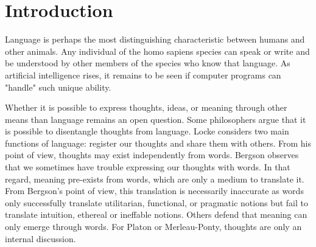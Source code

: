 \setchapterpreamble[u]{\margintoc}
\chapter{Introduction}


Language is perhaps the most distinguishing characteristic between humans and other animals. Any individual of the homo sapiens species can speak or write and be understood by other members of the species who know that language. As artificial intelligence rises, it remains to be seen if computer programs can "handle" such unique ability.

Whether it is possible to express thoughts, ideas, or meaning through other means than language remains an open question. Some philosophers argue that  it is possible to disentangle thoughts from language.
Locke considers two main functions of language: register our thoughts and share them with others. From his point of view, thoughts may exist independently from words.
Bergson observes that we sometimes have trouble expressing our thoughts with words. In that regard, meaning pre-exists from words, which are only a medium to translate it. From Bergson's point of view, this translation is necessarily inaccurate as words only successfully translate utilitarian, functional, or pragmatic notions but fail to translate intuition, ethereal or ineffable notions.
Others defend that meaning can only emerge through words. For Platon or Merleau-Ponty, thoughts are only an internal discussion.



